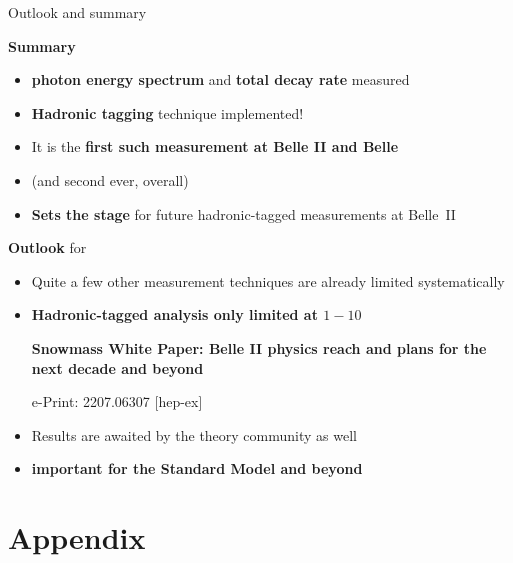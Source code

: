 \documentclass[xcolor=dvipsnames]{beamer}
\begin{document}
\begin{frame}{Outlook and summary}
\scriptsize


{\small \textbf{Summary}}


   \begin{itemize}
      \item \BtoXsgamma \textbf{photon energy spectrum} and \textbf{total decay rate} measured
      \item \textbf{Hadronic tagging} technique implemented!
      \item[\ra] It is the \textbf{first such measurement at Belle II and Belle}
      \item[] (and second ever, overall)
      \item \textbf{Sets the stage} for future hadronic-tagged \BtoXsgamma measurements at Belle~II
   \end{itemize}

   \vspace{15pt}

   {\small \textbf{Outlook} for \BtoXsgamma}

   \begin{itemize}
      \item Quite a few other measurement techniques are already limited systematically\\
      \item \textbf{Hadronic-tagged analysis only limited at $1-10$~\invab}\\
      \begin{flushright}
         \tiny
         \textbf{Snowmass White Paper: Belle II physics reach and plans for the next decade and beyond}
      
      e-Print: 2207.06307 [hep-ex]
      \end{flushright}
      \item Results are awaited by the theory community as well 
      \item[\ra] \textbf{important for the Standard Model and beyond}
   \end{itemize}




\end{frame}

\appendix

\section{Appendix}
\end{document}
